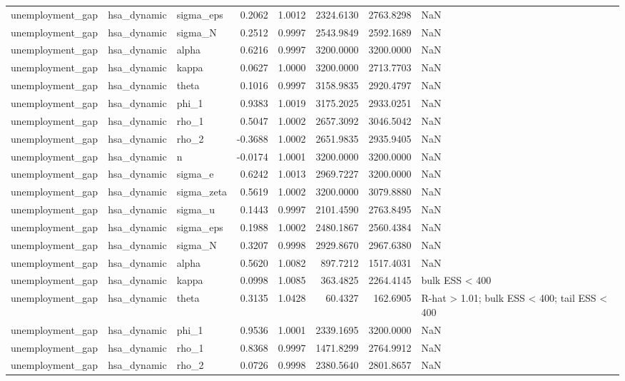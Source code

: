 \begin{tabular}{lllrrrrl}
unemployment\_gap & hsa\_dynamic & sigma\_eps & 0.2062 & 1.0012 & 2324.6130 & 2763.8298 & NaN \\
unemployment\_gap & hsa\_dynamic & sigma\_N & 0.2512 & 0.9997 & 2543.9849 & 2592.1689 & NaN \\
unemployment\_gap & hsa\_dynamic & alpha & 0.6216 & 0.9997 & 3200.0000 & 3200.0000 & NaN \\
unemployment\_gap & hsa\_dynamic & kappa & 0.0627 & 1.0000 & 3200.0000 & 2713.7703 & NaN \\
unemployment\_gap & hsa\_dynamic & theta & 0.1016 & 0.9997 & 3158.9835 & 2920.4797 & NaN \\
unemployment\_gap & hsa\_dynamic & phi\_1 & 0.9383 & 1.0019 & 3175.2025 & 2933.0251 & NaN \\
unemployment\_gap & hsa\_dynamic & rho\_1 & 0.5047 & 1.0002 & 2657.3092 & 3046.5042 & NaN \\
unemployment\_gap & hsa\_dynamic & rho\_2 & -0.3688 & 1.0002 & 2651.9835 & 2935.9405 & NaN \\
unemployment\_gap & hsa\_dynamic & n & -0.0174 & 1.0001 & 3200.0000 & 3200.0000 & NaN \\
unemployment\_gap & hsa\_dynamic & sigma\_e & 0.6242 & 1.0013 & 2969.7227 & 3200.0000 & NaN \\
unemployment\_gap & hsa\_dynamic & sigma\_zeta & 0.5619 & 1.0002 & 3200.0000 & 3079.8880 & NaN \\
unemployment\_gap & hsa\_dynamic & sigma\_u & 0.1443 & 0.9997 & 2101.4590 & 2763.8495 & NaN \\
unemployment\_gap & hsa\_dynamic & sigma\_eps & 0.1988 & 1.0002 & 2480.1867 & 2560.4384 & NaN \\
unemployment\_gap & hsa\_dynamic & sigma\_N & 0.3207 & 0.9998 & 2929.8670 & 2967.6380 & NaN \\
unemployment\_gap & hsa\_dynamic & alpha & 0.5620 & 1.0082 & 897.7212 & 1517.4031 & NaN \\
unemployment\_gap & hsa\_dynamic & kappa & 0.0998 & 1.0085 & 363.4825 & 2264.4145 & bulk ESS < 400 \\
unemployment\_gap & hsa\_dynamic & theta & 0.3135 & 1.0428 & 60.4327 & 162.6905 & R-hat > 1.01; bulk ESS < 400; tail ESS < 400 \\
unemployment\_gap & hsa\_dynamic & phi\_1 & 0.9536 & 1.0001 & 2339.1695 & 3200.0000 & NaN \\
unemployment\_gap & hsa\_dynamic & rho\_1 & 0.8368 & 0.9997 & 1471.8299 & 2764.9912 & NaN \\
unemployment\_gap & hsa\_dynamic & rho\_2 & 0.0726 & 0.9998 & 2380.5640 & 2801.8657 & NaN \\

\end{tabular}
